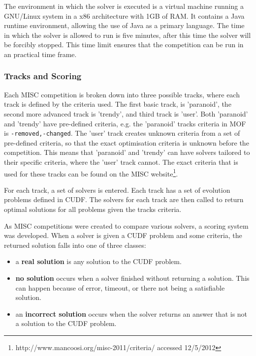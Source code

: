 The environment in which the solver is executed is a virtual machine running a GNU/Linux system in a x86 architecture with 1GB of RAM.
It contains a Java runtime environment, allowing the use of Java as a primary language.
The time in which the solver is allowed to run is five minutes, after this time the solver will be forcibly stopped.
This time limit ensures that the competition can be run in an practical time frame.

\subsubsection{Tracks and Scoring}
Each MISC competition is broken down into three possible tracks, where each track is defined by the criteria used.
The first basic track, is 'paranoid', the second more advanced track is 'trendy', and third track is 'user'.
Both 'paranoid' and 'trendy' have pre-defined criteria, e.g. the 'paranoid' tracks criteria in MOF is \texttt{-removed,-changed}.
The 'user' track creates unknown criteria from a set of pre-defined criteria, so that the exact optimisation criteria is unknown before the competition.
This means that 'paranoid' and 'trendy' can have solvers tailored to their specific criteria, where the 'user' track cannot.
The exact criteria that is used for these tracks can be found on the MISC website\footnote{http://www.mancoosi.org/misc-2011/criteria/ accessed 12/5/2012}.

For each track, a set of solvers is entered.
Each track has a set of evolution problems defined in CUDF.
The solvers for each track are then called to return optimal solutions for all problems given the tracks criteria.

As MISC competitions were created to compare various solvers, a scoring system was developed. 
When a solver is given a CUDF problem and some criteria, the returned solution falls into one of three classes:
\begin{itemize}
  \item a \textbf{real solution} is any solution to the CUDF problem.
  \item \textbf{no solution} occurs when a solver finished without returning a solution. This can happen because of error, timeout, or there not being a satisfiable solution.
  \item an \textbf{incorrect solution} occurs when the solver returns an answer that is not a solution to the CUDF problem.
\end{itemize}

